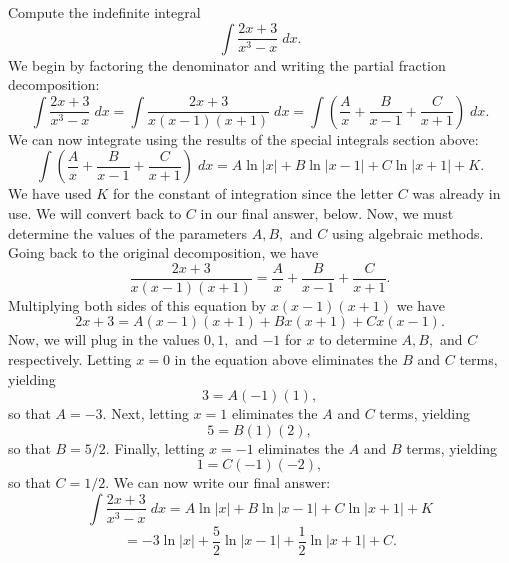 \documentclass{ximera}
\begin{document}
\begin{example}

Compute the indefinite integral
\[
\int \frac{2x+3}{x^3 -x} \; dx.
\]
We begin by factoring the denominator and writing the partial fraction decomposition:
\[
\int \frac{2x+3}{x^3 -x} \; dx = \int \frac{2x+3}{x(x-1)(x+1)} \; dx = \int \left( \frac{A}{x} + \frac{B}{x-1} + \frac{C}{x+1} \right) \; dx.
\]
We can now integrate using the results of the special integrals section above:
\[
\int \left( \frac{A}{x} + \frac{B}{x-1} + \frac{C}{x+1} \right) \; dx = A\ln|x| + B\ln|x-1| + C\ln|x+1| + K.
\]
We have used $K$ for the constant of integration since the letter $C$ was already in use.  We will convert back to $C$ in our final answer, below.
Now, we must determine the values of the parameters $A, B, $ and $C$ using algebraic methods.
Going back to the original decomposition, we have
\[
\frac{2x+3}{x(x-1)(x+1)} = \frac{A}{x}  + \frac{B}{x-1} + \frac{C}{x+1}.
\]
Multiplying both sides of this equation by $x(x-1)(x+1)$ we have
\[
2x+3 = A(x-1)(x+1) + Bx(x+1) + Cx(x-1).
\]
Now, we will plug in the values $0, 1, $ and $-1$ for $x$ to determine $A, B, $ and $C$ respectively.
Letting $x = 0$ in the equation above eliminates the $B$ and $C$ terms, yielding
\[
3 = A(-1)(1),
\]
so that $A = -3$.
Next, letting $x = 1$ eliminates the $A$ and $C$ terms, yielding
\[
5 = B(1)(2),
\]
so that $B = 5/2$. Finally, letting $x = -1$ eliminates the $A$ and $B$ terms, yielding
\[
1 = C(-1)(-2),
\]
so that $C = 1/2$.
We can now write our final answer:
\[
\int \frac{2x+3}{x^3 -x} \; dx = A\ln|x| + B\ln|x-1| + C\ln|x+1| + K
\]
\[
 = -3\ln|x| + \frac52 \ln|x-1| + \frac12 \ln|x+1| + C.
\]

\end{example}



\begin{center}
\begin{foldable}
\end{foldable}
\end{center}
\end{document}
